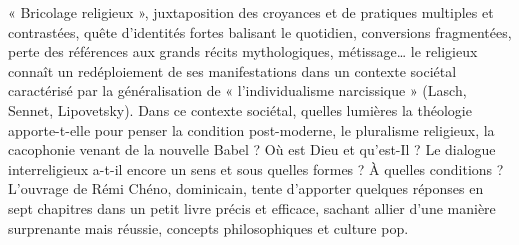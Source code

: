 « Bricolage religieux », juxtaposition des croyances et de pratiques multiples et contrastées, quête d’identités fortes balisant le quotidien, conversions fragmentées, perte des références aux grands récits mythologiques, métissage… le religieux connaît un redéploiement de ses manifestations dans un contexte sociétal caractérisé par la généralisation de « l’individualisme narcissique » (Lasch, Sennet, Lipovetsky). Dans ce contexte sociétal, quelles lumières la théologie apporte-t-elle pour penser la condition post-moderne, le pluralisme religieux, la cacophonie venant de la nouvelle Babel ? Où est Dieu et qu’est-Il ? Le dialogue interreligieux a-t-il encore un sens et sous quelles formes ? À quelles conditions ? L’ouvrage de Rémi Chéno, dominicain, tente d’apporter quelques réponses en sept chapitres dans un petit livre précis et efficace, sachant allier d’une manière surprenante mais réussie, concepts philosophiques et culture pop.


